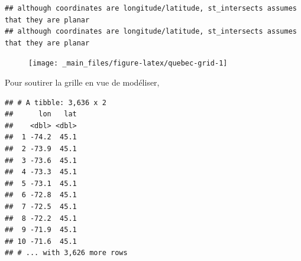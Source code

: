 \documentclass[]{book}
\newenvironment{Shaded}{\begin{snugshade}}{\end{snugshade}}
\newcommand{\DataTypeTok}[1]{\textcolor[rgb]{0.13,0.29,0.53}{#1}}
\newcommand{\DecValTok}[1]{\textcolor[rgb]{0.00,0.00,0.81}{#1}}
\newcommand{\FloatTok}[1]{\textcolor[rgb]{0.00,0.00,0.81}{#1}}
\newcommand{\KeywordTok}[1]{\textcolor[rgb]{0.13,0.29,0.53}{\textbf{#1}}}
\newcommand{\NormalTok}[1]{#1}
\newcommand{\OperatorTok}[1]{\textcolor[rgb]{0.81,0.36,0.00}{\textbf{#1}}}
\newcommand{\StringTok}[1]{\textcolor[rgb]{0.31,0.60,0.02}{#1}}
\begin{document}
\begin{verbatim}
## although coordinates are longitude/latitude, st_intersects assumes that they are planar
## although coordinates are longitude/latitude, st_intersects assumes that they are planar
\end{verbatim}

\begin{Shaded}
\end{Shaded}

\begin{figure}

{\centering \texttt{[image: \_main\_files/figure-latex/quebec-grid-1]} 

}

\caption{ }\label{fig:quebec-grid}
\end{figure}

Pour soutirer la grille en vue de modéliser,

\begin{Shaded}
\end{Shaded}

\begin{verbatim}
## # A tibble: 3,636 x 2
##      lon   lat
##    <dbl> <dbl>
##  1 -74.2  45.1
##  2 -73.9  45.1
##  3 -73.6  45.1
##  4 -73.3  45.1
##  5 -73.1  45.1
##  6 -72.8  45.1
##  7 -72.5  45.1
##  8 -72.2  45.1
##  9 -71.9  45.1
## 10 -71.6  45.1
## # ... with 3,626 more rows
\end{verbatim}
\end{document}
